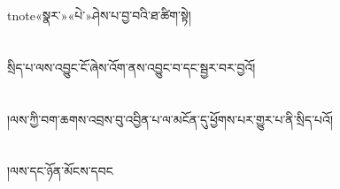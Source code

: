 tnote{«སྣར་»«པེ་»ཤེས་པ་}བྱ་བའི་ཐ་ཚིག་སྟེ།\chapter{ }སྲིད་པ་ལས་འབྱུང་ངོ་ཞེས་འོག་ནས་འབྱུང་བ་དང་སྦྱར་བར་བྱའོ།\chapter{ }།ལས་ཀྱི་བག་ཆགས་འབྲས་བུ་འབྱིན་པ་ལ་མངོན་དུ་ཕྱོགས་པར་གྱུར་པ་ནི་སྲིད་པའོ།\chapter{ }།ལས་དང་ཉོན་མོངས་དབང